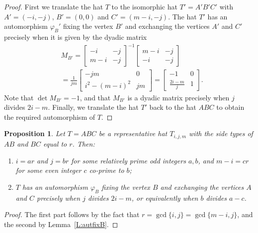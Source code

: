 \documentclass[12pt]{amsart}
\def\p{\varphi}
\theoremstyle{plain}
\newtheorem{proposition}[theorem]{Proposition}
\theoremstyle{definition}
\numberwithin{equation}{section}
\begin{document}
\begin{proof}
First we translate the hat $T$ to the isomorphic hat $T' = A'B'C'$ with $A' = (-i,-j)$, $B' =
(0,0)$ and $C' = (m-i, -j)$.
The hat $T'$ has an automorphism $\p_B'$ fixing the vertex $B'$ and exchanging the vertices $A'$
and $C'$ precisely when it is given by the dyadic matrix
\begin{align*}
&M_{B'} =
	\begin{bmatrix}
		-i&-j\\
		m-i&-j
	\end{bmatrix}^{-1}
	\begin{bmatrix}
		m-i&-j\\
		-i&-j
	\end{bmatrix}\\
	&= \frac{1}{jm}	\begin{bmatrix}
		-jm&0\\
		i^2 - (m-i)^2&jm
	\end{bmatrix}
	 = 	
    \begin{bmatrix}
 -1&0\\
\frac{2i - m}{j}& 1
\end{bmatrix}
.
\end{align*}
Note that $\det M_{B'} = -1$, and that $M_{B'}$ is a dyadic matrix precisely when $j$ divides
$2i-m$. Finally, we translate the hat $T'$ back to the hat $ABC$ to  obtain the required
automorphism of $T$.
\end{proof}



\begin{proposition}\label{C:rrm}
Let $T = ABC$ be a representative hat $T_{i,j,m}$ with the side types of  $AB$ and $BC$ equal to $r$. Then:
\begin{enumerate}
\item[(a)] $i = ar$ and  $j = br$ for some relatively prime odd integers $a, b$, and $m-i = cr$ for
    some even integer $c$ co-prime to $b$;
\item[(b)] $T$ has an automorphism $\p_B$ fixing the vertex $B$ and exchanging the vertices
    $A$ and $C$ precisely when $j$ divides $2i - m$, or equivalently when $b$ divides $a-c$.
\end{enumerate}
\end{proposition}

\begin{proof}
The first part follows by the fact that $r = \gcd\{i,j\} = \gcd\{m-i,j\}$, and the second by
Lemma~\ref{L:autfixB}.
\end{proof}
\end{document}
